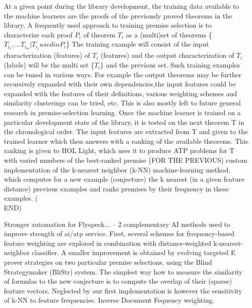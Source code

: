 \documentclass{article}
\begin{document}
At a given point during the library development, the training data available to
the machine learners are the proofs of the previously proved theorems in the
library. A frequently used approach to training premise selection is to
characterize each proof $P_i$ of theorem $T_i$ as a (multi)set of theorems
\{$T_{i_1}, ... T_{i_m}|T_{i_j} used in P_i$\} The training example will
consist of the input characterization (features) of $T_i$ (features) and the
output characterization of $T_i$ (labels) will be the multi set \{$T_i$\} and
the previous set. Such training examples can be tuned in various ways. For
example the output theorems may be further recursively expanded with their own
dependencies,the input features could be expanded with the features of their
definitions, various weighting schemes and similarity clusterings can be tried,
etc. This is also mostly left to future general research in premise-selection
learning. Once the machine learner is trained on a particular development state
of the library, it is tested on the next theorem T in the chronological order.
The input features are extracted from T and given to the trained learner which
then answers with a ranking of the available theorems. This ranking is given to
HOL Light, which uses it to produce ATP problems for T with varied numbers of
the best-ranked premise
(FOR THE PREVIOUS)
custom implementation of the k-nearest neighbor (k-NN) machine-learning method,
which computes for a new example (conjecture) the k nearest (in a given feature
distance) previous examples and ranks premises by their frequency in these
examples. (\\END)

Stronger automation for Flyspeck... \cite{FlyspeckFeatW} -- 2 complementary AI
methods used to improve strength of ai/atp service. First, several schemes for
frequency-based feature weighting are explored in combination with
distance-weighted k-nearest-neighbor classifier. A smaller improvement is
obtained by evolving targeted E prover strategies on two particular premise
selections, using the Blind Strategymaker (BliStr) system.  The  simplest  way  how  to  measure  the  similarity  of
formulas  to  the  new  conjecture  is  to compute the overlap of their
(sparse) feature vectors. Neglected  by  our  first  implementation  is
however  the  sensitivity  of k-NN  to  feature  frequencies. Inverse Document
Fequency weighting. 
\end{document}
